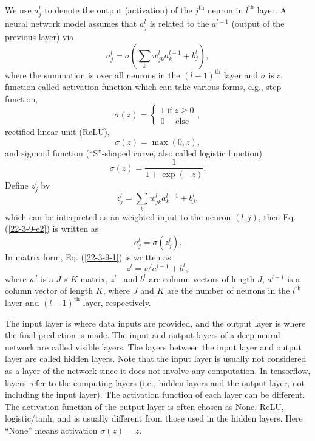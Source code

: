 \documentclass{article}
\newcommand{\tmop}[1]{\ensuremath{\operatorname{#1}}}
\begin{document}
\

We use $a_j^l$ to denote the output (activation) of the $j^{\tmop{th}}$
neuron in $l^{\tmop{th}}$ layer. A neural network model assumes that $a_j^l$
is related to the $a^{l - 1}$ (output of the previous layer) via
\begin{equation}
  \label{22-3-9-e2} a^l_j = \sigma \left( \sum_k w_{j k}^l a^{l - 1}_k + b^l_j
  \right),
\end{equation}
where the summation is over all neurons in the $(l - 1)^{\tmop{th}}$ layer and
$\sigma$ is a function called activation function which can take various
forms, e.g., step function,
\begin{equation}
  \sigma (z) = \left\{ \begin{array}{l}
    1 \tmop{if} z \geqslant 0\\
    0 \quad \tmop{else}
  \end{array} \right.,
\end{equation}
rectified linear unit (ReLU),
\begin{equation}
  \sigma (z) = \max (0, z),
\end{equation}
and sigmoid function (``S''-shaped curve, also called logistic function)
\begin{equation}
  \sigma (z) = \frac{1}{1 + \exp (- z)} .
\end{equation}
Define $z_j^l$ by
\begin{equation}
  \label{22-3-9-1} z^l_j = \sum_k w_{j k}^l a^{l - 1}_k + b^l_j,
\end{equation}
which can be interpreted as an weighted input to the neuron $(l, j)$, then Eq.
(\ref{22-3-9-e2}) is written as
\begin{equation}
  a_j^l = \sigma (z^l_j) .
\end{equation}
In matrix form, Eq. (\ref{22-3-9-1}) is written as
\begin{equation}
  z^l = w^l a^{l - 1} + b^l,
\end{equation}
where $w^l$ is a $J \times K$ matrix, $z^l$ \ and $b^l$ are column vectors of
length $J$, $a^{l - 1}$ is a column vector of length $K$, where $J$ and $K$
are the number of neurons in the $l^{\tmop{th}}$ layer and $(l -
1)^{\tmop{th}}$ layer, respectively.

The input layer is where data inputs are provided, and the output layer is
where the final prediction is made. The input and output layers of a deep
neural network are called visible layers. The layers between the input layer
and output layer are called hidden layers. Note that the input layer is
usually not considered as a layer of the network since it does not involve any
computation. In tensorflow, layers refer to the computing layers (i.e., hidden
layers and the output layer, not including the input layer). The activation
function of each layer can be different. The activation function of the output
layer is often chosen as None, ReLU, logistic/tanh, and is usually different
from those used in the hidden layers. Here ``None'' means activation $\sigma
(z) = z$.
\end{document}
